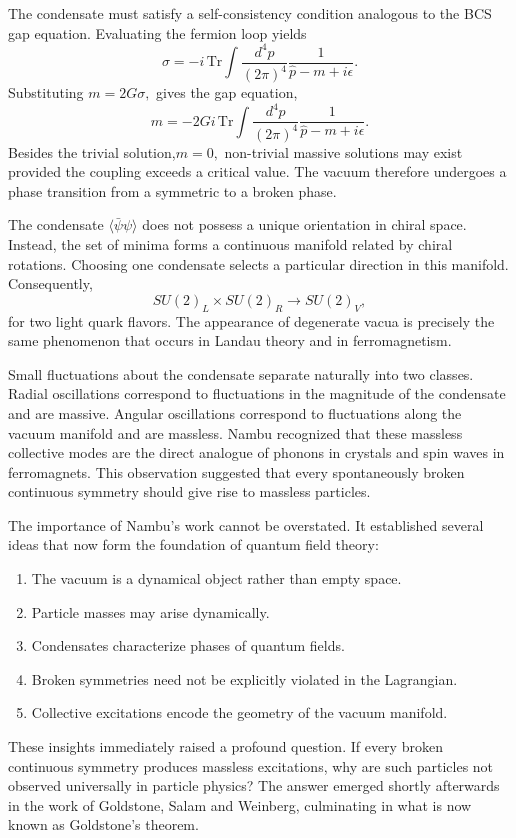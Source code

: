The condensate must satisfy a self-consistency condition analogous to
the BCS gap equation.
Evaluating the fermion loop yields
\[\sigma=-i\,\mathrm{Tr}\int\frac{d^4p}{(2\pi)^4}
\frac{1}{\hat p-m+i\epsilon}.\]
Substituting $m=2G\sigma,$ gives the gap equation,
\[m=-2Gi\,\mathrm{Tr}\int\frac{d^4p}{(2\pi)^4}
\frac{1}{\hat p-m+i\epsilon}.\]
Besides the trivial solution,$m=0,$
non-trivial massive solutions may exist provided the coupling exceeds a
critical value.
The vacuum therefore undergoes a phase transition from a symmetric to a
broken phase.

The condensate $\langle\bar\psi\psi\rangle$
does not possess a unique orientation in chiral space.
Instead, the set of minima forms a continuous manifold related by chiral
rotations. Choosing one condensate selects a particular direction in
this manifold.
Consequently,
\[SU(2)_L \times SU(2)_R \longrightarrow SU(2)_V,\]
for two light quark flavors.
The appearance of degenerate vacua is precisely the same phenomenon that
occurs in Landau theory and in ferromagnetism.

Small fluctuations about the condensate separate naturally into two
classes.
Radial oscillations correspond to fluctuations in the magnitude of the
condensate and are massive.
Angular oscillations correspond to fluctuations along the vacuum
manifold and are massless.
Nambu recognized that these massless collective modes are the direct
analogue of phonons in crystals and spin waves in ferromagnets.
This observation suggested that every spontaneously broken continuous
symmetry should give rise to massless particles.

The importance of Nambu's work cannot be overstated.
It established several ideas that now form the foundation of quantum
field theory:
\begin{enumerate}
\item The vacuum is a dynamical object rather than empty space.
\item Particle masses may arise dynamically.
\item Condensates characterize phases of quantum fields.
\item Broken symmetries need not be explicitly violated in the
Lagrangian.
\item Collective excitations encode the geometry of the vacuum manifold.
\end{enumerate}
These insights immediately raised a profound question.
If every broken continuous symmetry produces massless excitations, why
are such particles not observed universally in particle physics?
The answer emerged shortly afterwards in the work of Goldstone, Salam
and Weinberg, culminating in what is now known as Goldstone's theorem.

